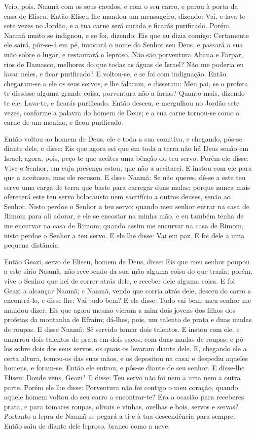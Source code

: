 Veio, pois, Naamã com os seus cavalos, e com o seu carro, e parou
à porta da casa de Eliseu. Então Eliseu lhe mandou um
mensageiro, dizendo: Vai, e lava-te sete vezes no Jordão, e a tua
carne será curada e ficarás purificado. Porém, Naamã muito se
indignou, e se foi, dizendo: Eis que eu dizia comigo: Certamente ele
sairá, pôr-se-á em pé, invocará o nome do Senhor seu Deus, e passará
a sua mão sobre o lugar, e restaurará o leproso. Não são
porventura Abana e Farpar, rios de Damasco, melhores do que todas as
águas de Israel? Não me poderia eu lavar neles, e ficar purificado?
E voltou-se, e se foi com indignação. Então chegaram-se a ele
os seus servos, e lhe falaram, e disseram: Meu pai, se o profeta te
dissesse alguma grande coisa, porventura não a farias? Quanto mais,
dizendo-te ele: Lava-te, e ficarás purificado. Então desceu,
e mergulhou no Jordão sete vezes, conforme a palavra do homem de
Deus; e a sua carne tornou-se como a carne de um menino, e ficou
purificado.

Então voltou ao homem de Deus, ele e toda a sua comitiva, e
chegando, pôs-se diante dele, e disse: Eis que agora sei que em toda
a terra não há Deus senão em Israel; agora, pois, peço-te que
aceites uma bênção do teu servo. Porém ele disse: Vive o
Senhor, em cuja presença estou, que não a aceitarei. E instou com
ele para que a aceitasse, mas ele recusou. E disse Naamã: Se
não queres, dê-se a este teu servo uma carga de terra que baste para
carregar duas mulas; porque nunca mais oferecerá este teu servo
holocausto nem sacrifício a outros deuses, senão ao Senhor.
Nisto perdoe o Senhor a teu servo; quando meu senhor entrar
na casa de Rimom para ali adorar, e ele se encostar na minha mão, e
eu também tenha de me encurvar na casa de Rimom; quando assim me
encurvar na casa de Rimom, nisto perdoe o Senhor a teu servo.
E ele lhe disse: Vai em paz. E foi dele a uma pequena
distância.

Então Geazi, servo de Eliseu, homem de Deus, disse: Eis que meu
senhor poupou a este sírio Naamã, não recebendo da sua mão alguma
coisa do que trazia; porém, vive o Senhor que hei de correr atrás
dele, e receber dele alguma coisa. E foi Geazi a alcançar
Naamã; e Naamã, vendo que corria atrás dele, desceu do carro a
encontrá-lo, e disse-lhe: Vai tudo bem? E ele disse: Tudo vai
bem; meu senhor me mandou dizer: Eis que agora mesmo vieram a mim
dois jovens dos filhos dos profetas da montanha de Efraim; dá-lhes,
pois, um talento de prata e duas mudas de roupas. E disse
Naamã: Sê servido tomar dois talentos. E instou com ele, e amarrou
dois talentos de prata em dois sacos, com duas mudas de roupas; e
pô-los sobre dois dos seus servos, os quais os levaram diante dele.
E, chegando ele a certa altura, tomou-os das suas mãos, e os
depositou na casa; e despediu aqueles homens, e foram-se.
Então ele entrou, e pôs-se diante de seu senhor. E disse-lhe
Eliseu: Donde vens, Geazi? E disse: Teu servo não foi nem a uma nem
a outra parte. Porém ele lhe disse: Porventura não foi
contigo o meu coração, quando aquele homem voltou do seu carro a
encontrar-te? Era a ocasião para receberes prata, e para tomares
roupas, olivais e vinhas, ovelhas e bois, servos e servas?
Portanto a lepra de Naamã se pegará a ti e à tua descendência
para sempre. Então saiu de diante dele leproso, branco como a neve.

